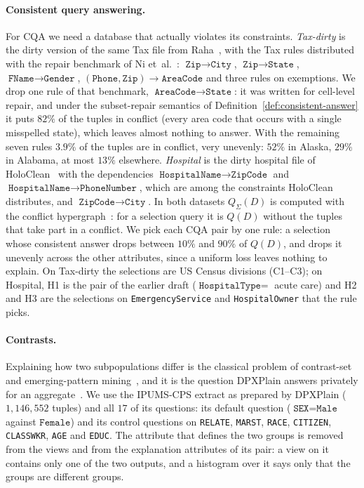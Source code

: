 \paragraph{Consistent query answering.}
For CQA we need a database that actually violates its constraints.
\emph{Tax-dirty} is the dirty version of the same Tax file from Raha~\cite{MahdaviAFMOST19}, with the Tax rules distributed with the repair benchmark of Ni et~al.~\cite{NiMZWLY24}: $\texttt{Zip}\to\texttt{City}$, $\texttt{Zip}\to\texttt{State}$, $\texttt{FName}\to\texttt{Gender}$, $(\texttt{Phone},\texttt{Zip})\to\texttt{AreaCode}$ and three rules on exemptions.
We drop one rule of that benchmark, $\texttt{AreaCode}\to\texttt{State}$: it was written for cell-level repair, and under the subset-repair semantics of Definition~\ref{def:consistent-answer} it puts $82\%$ of the tuples in conflict (every area code that occurs with a single misspelled state), which leaves almost nothing to answer.
With the remaining seven rules $3.9\%$ of the tuples are in conflict, very unevenly: $52\%$ in Alaska, $29\%$ in Alabama, at most $13\%$ elsewhere.
\emph{Hospital} is the dirty hospital file of HoloClean~\cite{rekatsinas2017} with the dependencies $\texttt{HospitalName}\to\texttt{ZipCode}$ and $\texttt{HospitalName}\to\texttt{PhoneNumber}$, which are among the constraints HoloClean distributes, and $\texttt{ZipCode}\to\texttt{City}$.
In both datasets $Q_\Sigma(D)$ is computed with the conflict hypergraph~\cite{chomicki2004}: for a selection query it is $Q(D)$ without the tuples that take part in a conflict.
We pick each CQA pair by one rule: a selection whose consistent answer drops between $10\%$ and $90\%$ of $Q(D)$, and drops it unevenly across the other attributes, since a uniform loss leaves nothing to explain.
On Tax-dirty the selections are US Census divisions (C1--C3); on Hospital, H1 is the pair of the earlier draft ($\texttt{HospitalType}=$ acute care) and H2 and H3 are the selections on \texttt{EmergencyService} and \texttt{HospitalOwner} that the rule picks.

\paragraph{Contrasts.}
Explaining how two subpopulations differ is the classical problem of contrast-set and emerging-pattern mining~\cite{BayPazzani01,DongLi99}, and it is the question DPXPlain answers privately for an aggregate~\cite{TaoGMR22}.
We use the IPUMS-CPS extract as prepared by DPXPlain ($1{,}146{,}552$ tuples) and all $17$ of its questions: its default question ($\texttt{SEX}=\texttt{Male}$ against $\texttt{Female}$) and its control questions on \texttt{RELATE}, \texttt{MARST}, \texttt{RACE}, \texttt{CITIZEN}, \texttt{CLASSWKR}, \texttt{AGE} and \texttt{EDUC}.
The attribute that defines the two groups is removed from the views and from the explanation attributes of its pair: a view on it contains only one of the two outputs, and a histogram over it says only that the groups are different groups.

